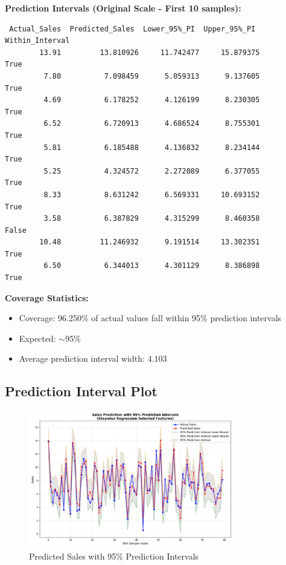 \documentclass[12pt]{article}
\begin{document}
\textbf{Prediction Intervals (Original Scale - First 10 samples):}
\begin{verbatim}
 Actual_Sales  Predicted_Sales  Lower_95%_PI  Upper_95%_PI  Within_Interval
        13.91         13.810926     11.742477     15.879375             True
         7.80          7.098459      5.059313      9.137605             True
         4.69          6.178252      4.126199      8.230305             True
         6.52          6.720913      4.686524      8.755301             True
         5.81          6.185488      4.136832      8.234144             True
         5.25          4.324572      2.272089      6.377055             True
         8.33          8.631242      6.569331     10.693152             True
         3.58          6.387829      4.315299      8.460358            False
        10.48         11.246932      9.191514     13.302351             True
         6.50          6.344013      4.301129      8.386898             True
\end{verbatim}

\textbf{Coverage Statistics:}
\begin{itemize}
    \item Coverage: 96.250\% of actual values fall within 95\% prediction intervals
    \item Expected: $\sim$95\%
    \item Average prediction interval width: 4.103
\end{itemize}

\subsection{Prediction Interval Plot}

\begin{figure}[H]
    \centering
    \includegraphics[width=0.8\textwidth]{images/prediction_intervals.png}
    \caption{Predicted Sales with 95\% Prediction Intervals}
    \label{fig:prediction_intervals}
\end{figure}
\end{document}
